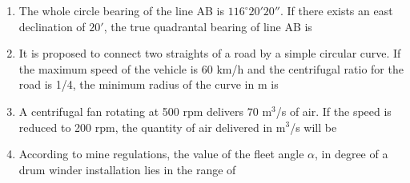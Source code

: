 \documentclass[journal]{IEEEtran}
\begin{document}
\begin{enumerate}
\item The whole circle bearing of the line AB is $116^\circ 20'20''$. If there exists an east declination of $20'$, the true quadrantal bearing of line AB is
\begin{enumerate}
\end{enumerate}

\item It is proposed to connect two straights of a road by a simple circular curve. If the maximum speed of the vehicle is 60 km/h and the centrifugal ratio for the road is 1/4, the minimum radius of the curve in m is
\begin{enumerate}
\end{enumerate}

\item A centrifugal fan rotating at 500 rpm delivers $70$ m$^3$/s of air. If the speed is reduced to 200 rpm, the quantity of air delivered in m$^3$/s will be
\begin{enumerate}
\end{enumerate}

\item According to mine regulations, the value of the fleet angle $\alpha$, in degree of a drum winder installation lies in the range of
\begin{enumerate}
\end{enumerate}


\end{enumerate}
\end{document}
